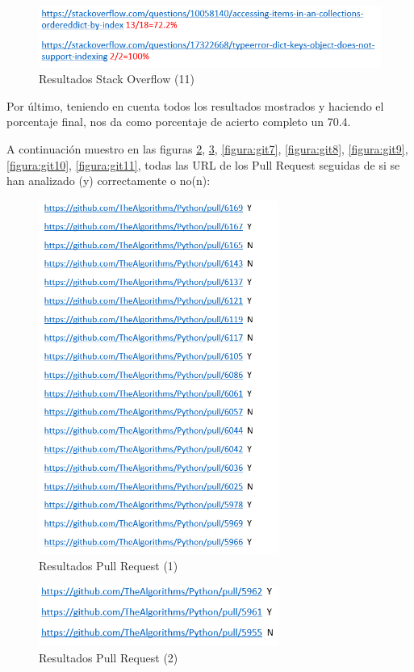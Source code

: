 \documentclass[a4paper, 12pt]{book}
\begin{document}
\begin{figure}
	\centering
    \includegraphics[width=1\textwidth]{img/stack15}
    \caption{Resultados Stack Overflow (11)}
    \label{figura:stack15}
 \end{figure}

Por último, teniendo en cuenta todos los resultados mostrados y haciendo el porcentaje final, nos da como porcentaje de acierto completo un 70.4.

A continuación muestro en las figuras \ref{figura:git5}, \ref{figura:git6}, \ref{figura:git7}, \ref{figura:git8}, \ref{figura:git9}, \ref{figura:git10}, \ref{figura:git11}, todas las URL de los Pull Request seguidas de si se han analizado (y) correctamente o no(n):

\begin{figure}
	\centering
    \includegraphics[width=0.7\textwidth]{img/git5}
    \caption{Resultados Pull Request (1)}
    \label{figura:git5}
 \end{figure}
 
\begin{figure}
	\centering
    \includegraphics[width=0.7\textwidth]{img/git6}
    \caption{Resultados Pull Request (2)}
    \label{figura:git6}
 \end{figure}
 
\end{document}
